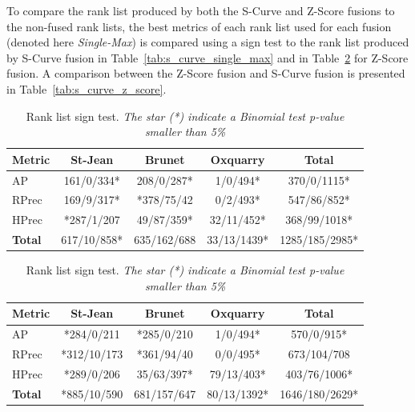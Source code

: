 To compare the rank list produced by both the S-Curve and Z-Score fusions to the non-fused rank lists, the best metrics of each rank list used for each fusion (denoted here \textit{Single-Max}) is compared using a sign test to the rank list produced by S-Curve fusion in Table~\ref{tab:s_curve_single_max} and in Table~\ref{tab:z_score_single_max} for Z-Score fusion.
A comparison between the Z-Score fusion and S-Curve fusion is presented in Table~\ref{tab:s_curve_z_score}.

\begin{table}
  \centering
  \caption{Rank list sign test. \textit{The star (*) indicate a Binomial test p-value smaller than 5\%}}
  \label{tab:fusion_sign_test_comparaisons}

  \label{tab:s_curve_single_max}
  \begin{tabular}{l c c c c}
    \toprule
    Metric         & St-Jean     & Brunet      & Oxquarry    & \textbf{Total} \\ \midrule
    AP             & 161/0/334*  & 208/0/287*  & 1/0/494*    & 370/0/1115*    \\
    RPrec          & 169/9/317*  & *378/75/42  & 0/2/493*    & 547/86/852*    \\
    HPrec          & *287/1/207  & 49/87/359*  & 32/11/452*  & 368/99/1018*   \\
    \textbf{Total} & 617/10/858* & 635/162/688 & 33/13/1439* & 1285/185/2985* \\
    \bottomrule
  \end{tabular}

  \label{tab:z_score_single_max}
  \begin{tabular}{l c c c c}
    \toprule
    Metric        & St-Jean     & Brunet      & Oxquarry    & \textbf{Total} \\ \midrule
    AP            & *284/0/211  & *285/0/210  & 1/0/494*    & 570/0/915*     \\
    RPrec         & *312/10/173 & *361/94/40  & 0/0/495*    & 673/104/708    \\
    HPrec         & *289/0/206  & 35/63/397*  & 79/13/403*  & 403/76/1006*   \\
    \textbf{Total}& *885/10/590 & 681/157/647 & 80/13/1392* & 1646/180/2629* \\
    \bottomrule
  \end{tabular}


\end{table}
